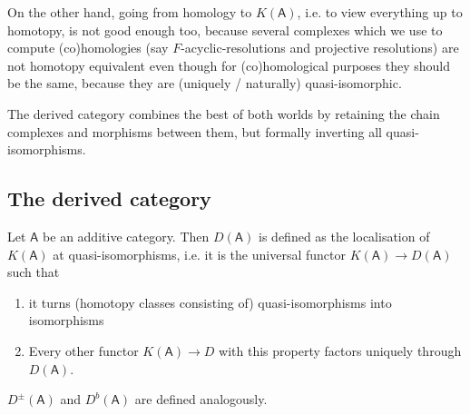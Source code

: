 \documentclass[fontsize=11pt,fleqn,a4paper]{scrartcl}
\begin{document}
\begin{remark}
On the other hand, going from homology to $K(\mathsf{A})$, i.e. to view everything up to homotopy, is not good enough too, because several complexes which we use to compute (co)homologies (say $F$-acyclic-resolutions and projective resolutions) are not homotopy equivalent even though for (co)homological purposes they should be the same, because they are (uniquely / naturally) quasi-isomorphic.

The derived category combines the best of both worlds by retaining the chain complexes and morphisms between them, but formally inverting all quasi-isomorphisms.
\end{remark}

\subsection{The derived category}

\begin{definition}
Let $\mathsf{A}$ be an additive category. Then $D(\mathsf{A})$ is defined as the localisation of $K(\mathsf{A})$ at quasi-isomorphisms, i.e. it is the universal functor $K(\mathsf{A}) \to D(\mathsf{A})$ such that
\begin{enumerate}
\item it turns (homotopy classes consisting of) quasi-isomorphisms into isomorphisms
\item Every other functor $K(\mathsf{A}) \to D$ with this property factors uniquely through $D(\mathsf{A})$.
\end{enumerate}
$D^\pm(\mathsf{A})$ and $D^b(\mathsf{A})$ are defined analogously.
\end{definition}
\end{document}

